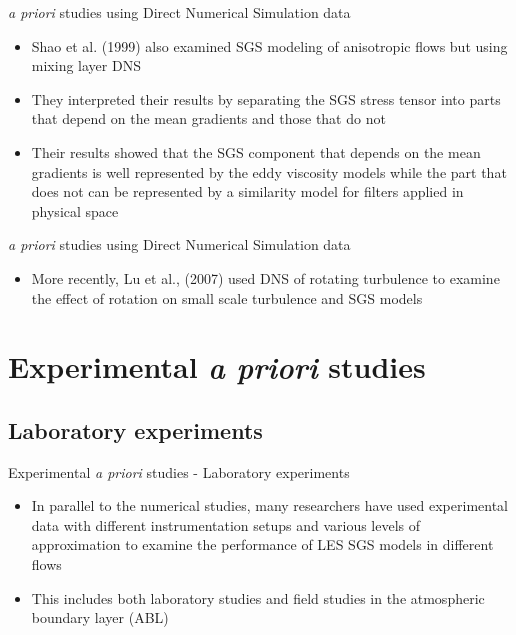
\begin{frame}{\textit{a priori} studies using Direct Numerical Simulation data}
\begin{itemize}
	\item Shao et al. (1999) also examined SGS modeling of anisotropic flows but using mixing layer DNS
	\item They interpreted their results by separating the SGS stress tensor into parts that depend on the mean gradients and those that do not
	\item Their results showed that the SGS component that depends on the mean gradients is well represented by the eddy viscosity models while the part that does not can be represented by a similarity model for filters applied in physical space
\end{itemize}
\end{frame}


\begin{frame}{\textit{a priori} studies using Direct Numerical Simulation data}
\begin{itemize}
	\item More recently, Lu et al., (2007) used DNS of rotating turbulence to examine the effect of rotation on small scale turbulence and SGS models
\end{itemize}
\end{frame}

\section{Experimental {\it a priori} studies}
\subsection{Laboratory experiments}

\begin{frame}{Experimental {\it a priori} studies - Laboratory experiments}
\begin{itemize}
	\item In parallel to the numerical studies, many researchers have used experimental data with different instrumentation setups and various levels of approximation to examine the performance of LES SGS models in different flows
	\item This includes both laboratory studies and field studies in the atmospheric boundary layer (ABL)
\end{itemize}
\end{frame}

